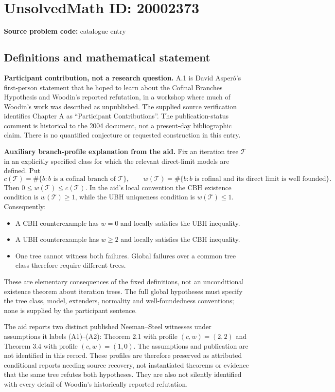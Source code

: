 \documentclass[11pt]{article}
\begin{document}
\section*{UnsolvedMath ID: 20002373}
\textbf{Source problem code:} catalogue entry
\subsection{Definitions and mathematical statement}
\textbf{Participant contribution, not a research question.} A.1 is David Asper\'o's first-person statement that he hoped to learn about the Cofinal Branches Hypothesis and Woodin's reported refutation, in a workshop where much of Woodin's work was described as unpublished. The supplied source verification identifies Chapter A as ``Participant Contributions''. The publication-status comment is historical to the 2004 document, not a present-day bibliographic claim. There is no quantified conjecture or requested construction in this entry.

\textbf{Auxiliary branch-profile explanation from the aid.} Fix an iteration tree $\mathcal T$ in an explicitly specified class for which the relevant direct-limit models are defined. Put
\[
 c(\mathcal T)=\#\{b:b\text{ is a cofinal branch of }\mathcal T\},
 \qquad
 w(\mathcal T)=\#\{b:b\text{ is cofinal and its direct limit is well founded}\}.
\]
Then $0\le w(\mathcal T)\le c(\mathcal T)$. In the aid's local convention the CBH existence condition is $w(\mathcal T)\ge1$, while the UBH uniqueness condition is $w(\mathcal T)\le1$. Consequently:
\begin{itemize}
\item A CBH counterexample has $w=0$ and locally satisfies the UBH inequality.
\item A UBH counterexample has $w\ge2$ and locally satisfies the CBH inequality.
\item One tree cannot witness both failures. Global failures over a common tree class therefore require different trees.
\end{itemize}
These are elementary consequences of the fixed definitions, not an unconditional existence theorem about iteration trees. The full global hypotheses must specify the tree class, model, extenders, normality and well-foundedness conventions; none is supplied by the participant sentence.

The aid reports two distinct published Neeman--Steel witnesses under assumptions it labels (A1)--(A2): Theorem 2.1 with profile $(c,w)=(2,2)$ and Theorem 3.4 with profile $(c,w)=(1,0)$. The assumptions and publication are not identified in this record. These profiles are therefore preserved as attributed conditional reports needing source recovery, not instantiated theorems or evidence that the same tree refutes both hypotheses. They are also not silently identified with every detail of Woodin's historically reported refutation.
\end{document}
